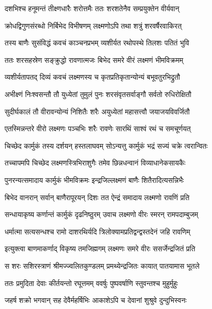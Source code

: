 \twolineshloka
{दशभिश्च हनूमन्तं तीक्ष्णधारैः शरोत्तमैः}
{ततः शरशतेनैव सम्प्रयुक्तेन वीर्यवान्} %

\twolineshloka
{क्रोधद्विगुणसंरब्धो निर्बिभेद विभीषणम्}
{लक्ष्मणोऽपि तथा शत्रुं शरवर्षैरवाकिरत्} %

\twolineshloka
{तस्य बाणैः सुसंविद्धं कवचं काञ्चनप्रभम्}
{व्यशीर्यत रथोपस्थे तिलशः पतितं भुवि} %

\twolineshloka
{ततः शरसहस्रेण सङ्क्रुद्धो रावणात्मजः}
{बिभेद समरे वीरं लक्ष्मणं भीमविक्रमम्} %

\twolineshloka
{व्यशीर्यतापतद् दिव्यं कवचं लक्ष्मणस्य च}
{कृतप्रतिकृतान्योन्यं बभूवतुरभिद्रुतौ} %

\twolineshloka
{अभीक्ष्णं निःश्वसन्तौ तौ युध्येतां तुमुलं पुनः}
{शरसंवृतसर्वाङ्गौ सर्वतो रुधिरोक्षितौ} %

\twolineshloka
{सुदीर्घकालं तौ वीरावन्योन्यं निशितैः शरैः}
{अयुध्येतां महासत्त्वौ जयाजयविवर्जितौ} %

\twolineshloka
{एतस्मिन्नन्तरे वीरो लक्ष्मणः पञ्चभिः शरैः}
{रावणेः सारथिं साश्वं रथं च समचूर्णयत्} %

\twolineshloka
{चिच्छेद कार्मुकं तस्य दर्शयन् हस्तलाघवम्}
{सोऽन्यत्तु कार्मुकं भद्रं सज्यं चक्रे त्वरान्वितः} %

\twolineshloka
{तच्चापमपि चिच्छेद लक्ष्मणस्त्रिभिराशुगैः}
{तमेव छिन्नधन्वानं विव्याधानेकसायकैः} %

\twolineshloka
{पुनरन्यत्समादाय कार्मुकं भीमविक्रमः}
{इन्द्रजिल्लक्ष्मणं बाणैः शितैरादित्यसन्निभैः} %

\twolineshloka
{बिभेद वानरान् सर्वान् बाणैरापूरयन् दिशः}
{तत ऐन्द्रं समादाय लक्ष्मणो रावणिं प्रति} %

\twolineshloka
{सन्धायाकृष्य कर्णान्तं कार्मुकं दृढनिष्ठुरम्}
{उवाच लक्ष्मणो वीरः स्मरन् रामपदाम्बुजम्} %

\twolineshloka
{धर्मात्मा सत्यसन्धश्च रामो दाशरथिर्यदि}
{त्रिलोक्यामप्रतिद्वन्द्वस्तदेनं जहि रावणिम्} %

\twolineshloka
{इत्युक्त्वा बाणमाकर्णाद् विकृष्य तमजिह्मगम्}
{लक्ष्मणः समरे वीरः ससर्जेन्द्रजितं प्रति} %

\twolineshloka
{स शरः सशिरस्त्राणं श्रीमज्ज्वलितकुण्डलम्}
{प्रमथ्येन्द्रजितः कायात् पातयामास भूतले} %

\twolineshloka
{ततः प्रमुदिता देवाः कीर्तयन्तो रघूत्तमम्}
{ववर्षुः पुष्पवर्षाणि स्तुवन्तश्च मुहुर्मुहुः} %

\twolineshloka
{जहर्ष शक्रो भगवान् सह देवैर्महर्षिभिः}
{आकाशेऽपि च देवानां शुश्रुवे दुन्दुभिस्वनः} %

